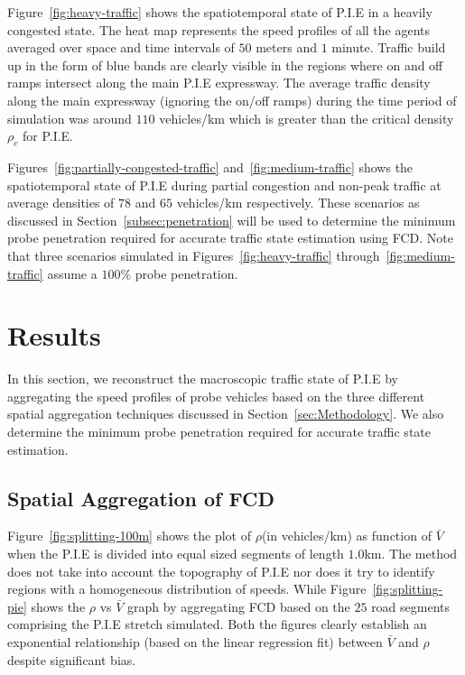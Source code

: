 \documentclass[procedia]{easychair}
\begin{document}
 
 Figure~\ref{fig:heavy-traffic} shows the spatiotemporal state of P.I.E in a heavily congested state. The heat map represents the speed profiles of all the agents averaged over space and time intervals of $50$ meters and $1$ minute. Traffic build up in the form of blue bands are clearly visible in the regions where on and off ramps intersect along the main P.I.E expressway. The average traffic density along the main expressway (ignoring the on/off ramps) during the time period of simulation was around $110$ vehicles/km which is greater than the critical density $\rho_{c}$ for P.I.E.
 
 Figures~\ref{fig:partially-congested-traffic} and~\ref{fig:medium-traffic}  shows the spatiotemporal state of P.I.E during partial congestion and non-peak traffic at  average densities of $78$ and $65$ vehicles/km respectively. These scenarios as discussed in Section~\ref{subsec:penetration} will be used to determine the minimum probe penetration required for accurate traffic state estimation using FCD. Note that  three scenarios simulated in Figures~\ref{fig:heavy-traffic} through~\ref{fig:medium-traffic} assume a $100\%$ probe penetration. 
 


\section{Results}
\label{sec:experiments}

In this section, we reconstruct the macroscopic traffic state of P.I.E by aggregating the speed profiles of probe vehicles based on the three different spatial aggregation techniques discussed in Section~\ref{sec:Methodology}. We also determine the minimum probe penetration required for accurate traffic state estimation.

\subsection{Spatial Aggregation of FCD}
\label{subsec:partitioning}


 Figure~\ref{fig:splitting-100m} shows the plot of $\rho$(in vehicles/km) as function of $\bar{V}$ when the P.I.E is divided into equal sized segments of length $1.0$km. The method does not take
 into account the topography of P.I.E nor does it try to identify regions with a homogeneous distribution of speeds. While Figure~\ref{fig:splitting-pie} shows the $\rho$ vs $\bar{V}$ graph by aggregating FCD based on the $25$ road segments comprising the P.I.E stretch simulated. Both the figures clearly establish an exponential relationship (based on the linear regression fit) between $\bar{V}$ and $\rho$ despite significant bias.
 
\end{document}
